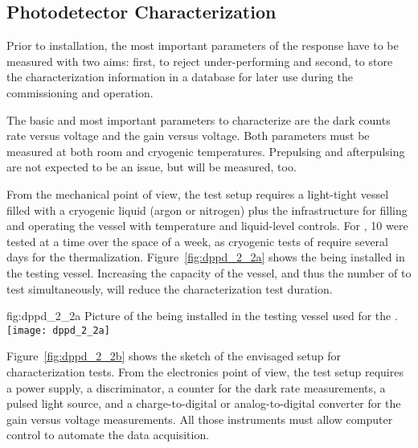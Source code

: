 \subsection{Photodetector Characterization}
\label{sec:fddp-pd-2.2}

Prior to installation, the most important parameters of the  response have to be measured with two aims: first, to reject under-performing  and second, to store the characterization information in a database for later use during the  commissioning and operation.

The basic and most important parameters to characterize are the dark counts rate versus voltage and the gain versus voltage. Both parameters must be measured at both room and  cryogenic temperatures. Prepulsing and afterpulsing are not expected to be an issue, but will be measured, too. 

From the mechanical point of view, the test setup requires a light-tight vessel filled with a cryogenic liquid (argon or nitrogen) plus the infrastructure for filling and operating the vessel with temperature and liquid-level controls. For , \num{10}  were tested at a time %
over the space of a week, as cryogenic tests of  
require several days for the  thermalization. Figure~\ref{fig:dppd_2_2a} shows the    being installed in the testing vessel. %
Increasing the capacity of the vessel, and thus the number of  to test simultaneously, %
will reduce the characterization test duration.

\begin{dunefigure}{fig:dppd_2_2a}
{Picture of the  being installed in the testing vessel used for the  .}
\texttt{[image: dppd\_2\_2a]}
\end{dunefigure}

Figure~\ref{fig:dppd_2_2b} shows the sketch of the envisaged setup for  characterization tests. From the electronics point of view, the test setup requires a  power supply, a discriminator, a counter for the dark rate measurements, a pulsed light source, and a charge-to-digital or analog-to-digital converter for the  gain versus voltage measurements. All those instruments must allow computer control to automate the data acquisition.

